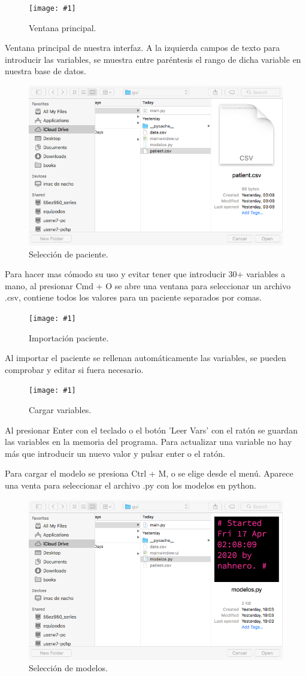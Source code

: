 \documentclass{article}
\newcommand{\incpng}[2]{
\begin{figure}[h]
\centering
\texttt{[image: \#1]}
\caption{#2}
\end{figure}
}
\begin{document}
\newpage

\vfill
\incpng{../images/s1.png} {Ventana principal.}
\vfill

Ventana principal de nuestra interfaz. A la izquierda campos de texto
para introducir las variables, se muestra entre paréntesis el rango de
dicha variable en nuestra base de datos.

\vfill
\begin{figure}[h]
\centering
\includegraphics[trim=3cm 1cm 3cm 0cm, width = 0.5\linewidth]{../images/s2.png}
\caption{Selección de paciente.}
\end{figure}
\vfill

Para hacer mas cómodo su uso y evitar tener que introducir 30+
variables a mano, al presionar Cmd + O se abre una ventana para
seleccionar un archivo .csv, contiene todos los valores para un
paciente separados por comas.

\newpage
\incpng{../images/s3.png} {Importación paciente.}

Al importar el paciente se rellenan automáticamente las variables,  se
pueden comprobar y editar si fuera necesario.

\incpng{../images/s4.png} {Cargar variables.}

Al presionar Enter con el teclado o el botón 'Leer Vars' con el  ratón
se guardan las variables en la memoria del programa.  Para  actualizar
una variable no hay más que introducir un nuevo valor y pulsar enter o
el ratón.

Para cargar el modelo se presiona Ctrl + M, o se elige desde el menú.
Aparece una venta para seleccionar el archivo .py con los modelos en
python.

\newpage
\begin{figure}[h]
\centering
\includegraphics[trim=3cm 1cm 3cm 0cm, width = 0.5\linewidth]{../images/s5.png}
\caption{Selección de modelos.}
\end{figure}
\end{document}
